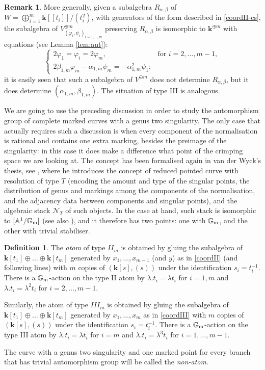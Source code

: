 \documentclass[11pt]{amsart}
\renewcommand{\k}{\mathbf k}
\newcommand{\Aaff}{\mathbb A}
\newcommand{\Gm}{\mathbb{G}_{\rm{m}}}
\theoremstyle{plain}
\theoremstyle{definition}
\newtheorem{dfn}[thm]{Definition}
\newtheorem{rem}[thm]{Remark}
\begin{document}
\begin{rem}
 More generally, given a subalgebra $R_{\alpha,\beta}$ of $W=\bigoplus_{i=1}^m\k[\![t_i]\!]/(t_i^2)$, with generators of the form described in \eqref{coordII-cs}, the subalgebra of $V^{\oplus m}_{(\varphi_i,\psi_i)_{i=1,\ldots,m}}$ preserving $R_{\alpha,\beta}$ is isomorphic to $\k^{\oplus m}$ with equations (see Lemma \ref{lem:aut}):
 \[\begin{cases} 2\varphi_1=\varphi_i=2\varphi_m, & \text{for } i=2,\ldots,m-1,\\ 2\beta_{1,m}\varphi_m-\alpha_{1,m}\psi_m=-\alpha_{1,m}^2\psi_1;\end{cases}\]
 it is easily seen that such a subalgebra of $V^{\oplus m}$ does not determine $R_{\alpha,\beta}$, but it does determine $(\alpha_{1,m},\beta_{1,m})$. The situation of type III is analogous.
\end{rem}

We are going to use the preceding discussion in order to study the automorphism group of complete marked curves with a genus two singularity. The only case that actually requires such a discussion is when every component of the normalisation is rational and contains one extra marking, besides the preimage of the singularity: in this case it does make a difference what point of the crimping space we are looking at. The concept has been formalised again in van der Wyck's thesis, see \cite[Proposition 1.102, Theorem 1.105 and Corollary 1.106]{vdW}, where he introduces the concept of reduced pointed curve with resolution of type $T$ (encoding the amount and type of the singular points, the distribution of genus and markings among the components of the normalisation, and the adjacency data between components and singular points), and the algebraic stack $\mathcal N_T$ of such objects. In the case at hand, such stack is isomorphic to $[\Aaff^1/\Gm]$ (see also \cite[Examples 1.111-112]{vdW}), and it therefore has two points: one with $\Gm$, and the other with trivial stabiliser.

\begin{dfn}
 The \emph{atom} of type $I\!I_m$ is obtained by gluing the subalgebra of $\k[t_1]\oplus\ldots\oplus\k[t_m]$ generated by $x_1,\ldots,x_{m-1}$ (and $y$) as in \eqref{coordII} (and following lines) with $m$ copies of $(\k[s],(s))$ under the identification $s_i=t_i^{-1}$. There is a $\Gm$-action on the type II atom by $\lambda.t_i=\lambda t_i$ for $i=1,m$ and $\lambda.t_i=\lambda^2 t_i$ for $i=2,\ldots,m-1$.
 
 Similarly, the atom of type $I\!I\!I_m$ is obtained by gluing the subalgebra of $\k[t_1]\oplus\ldots\oplus\k[t_m]$ generated by $x_1,\ldots,x_m$ as in \eqref{coordIII} with $m$ copies of $(\k[s],(s))$ under the identification $s_i=t_i^{-1}$. There is a $\Gm$-action on the type III atom by $\lambda.t_i=\lambda t_i$ for $i=m$ and $\lambda.t_i=\lambda^3 t_i$ for $i=1,\ldots,m-1$.
 
 The curve with a genus two singularity and one marked point for every branch that has trivial automorphism group will be called the \emph{non-atom}.
\end{dfn}
\end{document}
